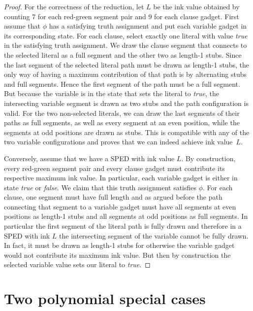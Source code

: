 \documentclass[a4paper,english,numberwithinsect]{eurocg18}
\begin{document}
\begin{proof}
	For the correctness of the reduction, let $L$ be the ink value obtained by counting 7 for each red-green segment pair and 9 for each clause gadget. 
	First assume that $\phi$ has a satisfying truth assignment and put each variable gadget in its corresponding state.
	For each clause, select exactly one literal with value \emph{true} in the satisfying truth assignment. 
	We draw the clause segment that connects to the selected literal as a full segment and the other two as length-1 stubs.
	Since the last segment of the selected literal path must be drawn as length-1 stubs, the only way of having a maximum contribution of that path is by alternating stubs and full segments.
	Hence the first segment of the path must be a full segment.
	But because the variable is in the state that sets the literal to \emph{true}, the intersecting variable segment is drawn as two stubs and the path configuration is valid.
	For the two non-selected literals, we can draw the last segments of their paths as full segments, as well as every segment at an even position, while the segments at odd positions are drawn as stubs. 
	This is compatible with any of the two variable configurations and proves that we can indeed achieve ink value~$L$.
	
	Conversely, assume that we have a SPED with ink value $L$. 
	By construction, every red-green segment pair and every clause gadget must contribute its respective maximum ink value.
	In particular, each variable gadget is either in state \emph{true} or \emph{false}.
	We claim that this truth assignment satisfies $\phi$.
	For each clause, one segment must have full length and as argued before the path connecting that segment to a variable gadget must have all segments at even positions as length-1 stubs and all segments at odd positions as full segments. 
	In particular the first segment of the literal path is fully drawn and therefore in a SPED with ink $L$ the intersecting segment of the variable cannot be fully drawn.
	In fact, it must be drawn as length-1 stubs for otherwise the variable gadget would not contribute its maximum ink value.
	But then by construction the selected variable value sets our literal to \emph{true}.
\end{proof}

\section{Two polynomial special cases}

\end{document}
